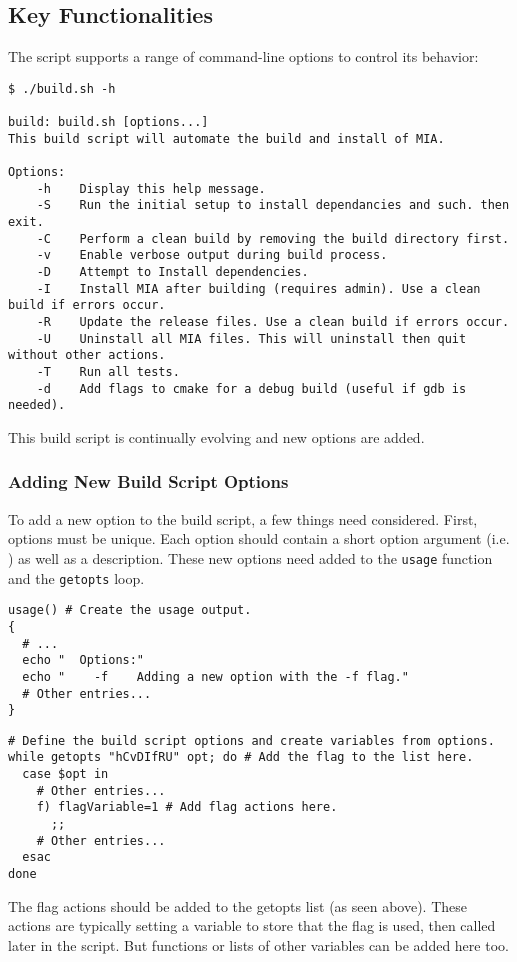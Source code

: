 \subsection{Key Functionalities}

The script supports a range of command-line options to control its behavior:
\begin{lstlisting}[style=terminalstyle]
$ ./build.sh -h

build: build.sh [options...]
This build script will automate the build and install of MIA.

Options:
    -h    Display this help message.
	-S    Run the initial setup to install dependancies and such. then exit.
	-C    Perform a clean build by removing the build directory first.
	-v    Enable verbose output during build process.
	-D    Attempt to Install dependencies.
	-I    Install MIA after building (requires admin). Use a clean build if errors occur.
	-R    Update the release files. Use a clean build if errors occur.
	-U    Uninstall all MIA files. This will uninstall then quit without other actions.
	-T    Run all tests.
	-d    Add flags to cmake for a debug build (useful if gdb is needed).
\end{lstlisting}
This build script is continually evolving and new options are added.

\subsubsection{Adding New Build Script Options}

To add a new option to the build script, a few things need considered. First, options must be unique. Each option should contain a short option argument (i.e. ) as well as a description. These new options need added to the \texttt{usage} function and the \texttt{getopts} loop.
\begin{lstlisting}[style=shellstyle]
usage() # Create the usage output.
{
  # ...
  echo "  Options:"
  echo "    -f    Adding a new option with the -f flag."
  # Other entries...
}
\end{lstlisting}
\begin{lstlisting}[style=shellstyle]
# Define the build script options and create variables from options.
while getopts "hCvDIfRU" opt; do # Add the flag to the list here.
  case $opt in
    # Other entries...
    f) flagVariable=1 # Add flag actions here.
      ;;
    # Other entries...
  esac
done
\end{lstlisting}
The flag actions should be added to the getopts list (as seen above). These actions are typically setting a variable to store that the flag is used, then called later in the script. But functions or lists of other variables can be added here too.

